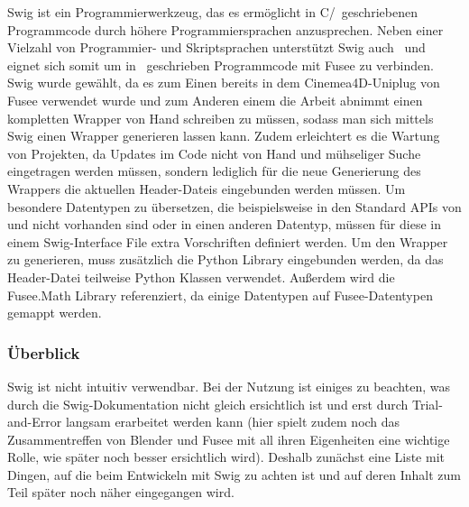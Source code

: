 \label{sec:SWIG}

Swig ist ein Programmierwerkzeug, das es ermöglicht in C/\CC~geschriebenen Programmcode durch höhere Programmiersprachen anzusprechen. Neben einer Vielzahl von Programmier- und Skriptsprachen unterstützt Swig auch \CS~und eignet sich somit um in \CC~geschrieben Programmcode mit Fusee zu verbinden. Swig wurde gewählt, da es zum Einen bereits in dem Cinemea4D-Uniplug von Fusee verwendet wurde und zum Anderen einem die Arbeit abnimmt einen kompletten Wrapper von Hand schreiben zu müssen, sodass man sich mittels Swig einen Wrapper generieren lassen kann. Zudem erleichtert es die Wartung von Projekten, da Updates im Code nicht von Hand und mühseliger Suche eingetragen werden müssen, sondern lediglich für die neue Generierung des Wrappers die aktuellen Header-Dateis eingebunden werden müssen. Um besondere Datentypen zu übersetzen, die beispielsweise in den Standard APIs von \CC und \CS nicht vorhanden sind oder in einen anderen Datentyp, müssen für diese in einem Swig-Interface File extra Vorschriften definiert werden.
Um den Wrapper zu generieren, muss zusätzlich die Python Library eingebunden werden, da das Header-Datei teilweise Python Klassen verwendet. Außerdem wird die Fusee.Math Library referenziert, da einige Datentypen auf Fusee-Datentypen gemappt werden.

\subsubsection{Überblick}
Swig ist nicht intuitiv verwendbar. Bei der Nutzung ist einiges zu beachten, was durch die Swig-Dokumentation nicht gleich ersichtlich ist und erst durch Trial-and-Error langsam erarbeitet werden kann (hier spielt zudem noch das Zusammentreffen von Blender und Fusee mit all ihren Eigenheiten eine wichtige Rolle, wie später noch besser ersichtlich wird). Deshalb zunächst eine Liste mit Dingen, auf die beim Entwickeln mit Swig zu achten ist und auf deren Inhalt zum Teil später noch näher eingegangen wird.


